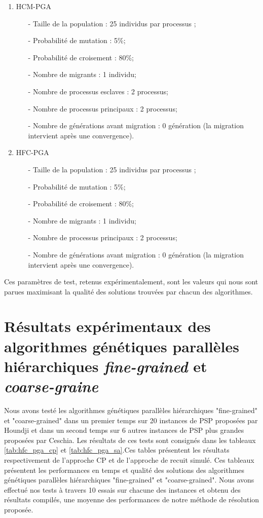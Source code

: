 		\begin{enumerate}
			\item HCM-PGA \\
				\begin{itemize}
					\item[-] Taille de la population : 25 individus par processus ;
			        \item[-] Probabilité de mutation : 5\%;
			        \item[-] Probabilité de croisement : 80\%;
			        \item[-] Nombre de migrants : 1 individu;
		 	        \item[-] Nombre de processus esclaves : 2 processus;
			        \item[-] Nombre de processus principaux : 2 processus;
			        \item[-] Nombre de générations avant migration : 0 génération (la migration intervient après une convergence).
				\end{itemize}
				\vspace*{.5cm}
			\item HFC-PGA \\
				\begin{itemize}
					\item[-] Taille de la population : 25 individus par processus ;
			        \item[-] Probabilité de mutation : 5\%;
			        \item[-] Probabilité de croisement : 80\%;
			        \item[-] Nombre de migrants : 1 individu;
			        \item[-] Nombre de processus principaux : 2 processus;
			        \item[-] Nombre de générations avant migration : 0 génération (la migration intervient après une convergence).
				\end{itemize}
		\end{enumerate}
		Ces paramètres de test, retenus expérimentalement, sont les valeurs qui nous sont parues maximisant la qualité des solutions trouvées par chacun des algorithmes.		
		
		\section{Résultats expérimentaux des algorithmes génétiques parallèles hiérarchiques \emph{fine-grained} et \emph{coarse-graine}}
		Nous avons testé les algorithmes génétiques parallèles hiérarchiques "fine-grained" et "coarse-grained" dans un premier temps sur 20 instances de PSP proposées par Houndji et dans un second temps sur 6 autres instances de PSP plus grandes proposées par Ceschia. Les résultats de ces tests sont consignés dans les tableaux \ref{tab:hfc_pga_cp} et \ref{tab:hfc_pga_sa}.Ces tables présentent les résultats respectivement de l'approche CP et de l'approche de recuit simulé. Ces tableaux présentent les performances en temps et qualité des solutions des algorithmes génétiques parallèles hiérarchiques "fine-grained" et "coarse-grained". Nous avons effectué nos tests à travers 10 essais sur chacune des instances et obtenu des résultats compilés, une moyenne des performances de notre méthode de résolution proposée.
		
